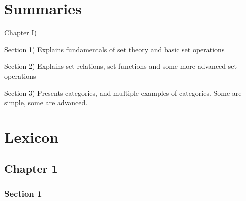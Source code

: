 \documentclass[12pt, letterpaper, twoside]{report}
\begin{document}
\author{Multiversity \textit{Algebra Chapter 0} Reading Group}
\part{Summaries}

Chapter I)

Section 1) Explains fundamentals of set theory and basic set operations

Section 2) Explains set relations, set functions and some more advanced set operations

Section 3) Presents categories, and multiple examples of categories. Some are simple, some are advanced.

\newpage
\part{Lexicon}
\chapter*{Chapter 1}

\section*{Section 1}
\end{document}
